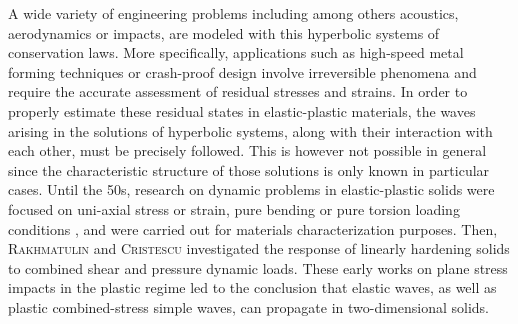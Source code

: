A wide variety of engineering problems including among others acoustics, aerodynamics or impacts, are modeled with this hyperbolic systems of conservation laws.
More specifically, applications such as high-speed metal forming techniques or crash-proof design involve irreversible phenomena and require the accurate assessment of residual stresses and strains. 
In order to properly estimate these residual states in elastic-plastic materials, the waves arising in the solutions of hyperbolic systems, along with their interaction with each other, must be precisely followed.
This is however not possible in general since the characteristic structure of those solutions is only known in particular cases.
%
Until the 50s, research on dynamic problems in elastic-plastic solids were focused on uni-axial stress or strain, pure bending or pure torsion loading conditions \cite{Taylor,vonKarman}, and were carried out for materials characterization purposes.
Then, \textsc{Rakhmatulin} \cite{Rakhmatulin} and \textsc{Cristescu} \cite{CRISTESCU19591605} investigated the response of linearly hardening solids to combined shear and pressure dynamic loads.
These early works on plane stress impacts in the plastic regime led to the conclusion that elastic waves, as well as plastic combined-stress simple waves, can propagate in two-dimensional solids. 
